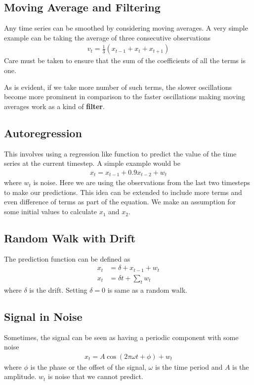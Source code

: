 \documentclass[../time_series_notes.tex]{subfiles}
\begin{document}
    \subsection{Moving Average and Filtering}
    Any time series can be smoothed by considering moving averages. A very simple example can be taking the average of three consecutive observations
    \begin{align*}
        v_{t} = \frac{1}{3}(x_{t-1} + x_{t} + x_{t+1})
    \end{align*}
    Care must be taken to ensure that the sum of the coefficients of all the terms is one.\newline

    As is evident, if we take more number of such terms, the slower oscillations become more prominent in comparison to the faster oscillations making moving averages work as a kind of \textbf{filter}.

    \subsection{Autoregression}
    This involves using a regression like function to predict the value of the time series at the current timestep. A simple example would be
    \begin{align*}
        x_{t} = x_{t-1} + 0.9x_{t-2} + w_{t}
    \end{align*}
    where $w_{t}$ is noise. Here we are using the observations from the last two timesteps to make our predictions. This idea can be extended to include more terms and even difference of terms as part of the equation. We make an assumption for some initial values to calculate $x_{1}$ and $x_{2}$.

    \subsection{Random Walk with Drift}
    The prediction function can be defined as
    \begin{align*}
        x_{t} &= \delta + x_{t-1} + w_{t}\\
        x_{t} &= \delta t + \sum_{t} w_{t}
    \end{align*}
    where $\delta$ is the drift. Setting $\delta = 0$ is same as a random walk.

    \subsection{Signal in Noise}
    Sometimes, the signal can be seen as having a periodic component with some noise
    \begin{align*}
        x_{t} = A\cos (2\pi \omega t + \phi) + w_{t}
    \end{align*}
    where $\phi$ is the phase or the offset of the signal, $\omega$ is the time period and $A$ is the amplitude. $w_{t}$ is noise that we cannot predict.\newline
\end{document}
